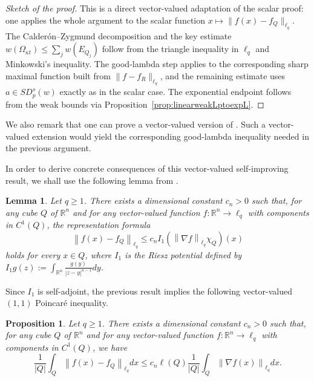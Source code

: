 \documentclass[reqno, 10pt, oneside]{amsart}
\numberwithin{equation}{section}
\newtheorem{lemma}[theorem]{Lemma}
\newtheorem{proposition}[theorem]{Proposition}
\numberwithin{theorem}{section}
\newcommand{\R}{{\mathbb R}}
\newcommand{\1}{{\rm 1\hspace*{-0.4ex}%
\rule{0.1ex}{1.52ex}\hspace*{0.2ex}}}
\begin{document}
\begin{proof}[Sketch of the proof]
This is a direct vector-valued adaptation of the scalar proof: one applies the whole argument to the scalar function $x\mapsto \|f(x)-f_Q\|_{\ell_q}$. The Calderón--Zygmund decomposition and the key estimate $w(\Omega_{\kappa t})\le \sum_j w(E_{Q_j})$ follow from the triangle inequality in $\ell_q$ and Minkowski's inequality. The good-lambda step applies to the corresponding sharp maximal function built from $\|f-f_R\|_{\ell_q}$, and the remaining estimate uses $a\in SD_p^s(w)$ exactly as in the scalar case. The exponential endpoint follows from the weak bounds via Proposition~\ref{prop:linearweakLptoexpL}.
\end{proof}

We also remark that one can prove a vector-valued version of \cite[Theorem 1.1]{CP}. Such a vector-valued extension would yield the corresponding good-lambda inequality needed in the previous argument.

In order to derive concrete consequences of this vector-valued self-improving result, we shall use the following lemma from \cite{MP}.

\begin{lemma}
	Let $q\ge 1$. There exists a dimensional constant $c_n>0$ such that, for any cube $Q$ of $\R^n$ and for any vector-valued function $f: \R^n\longrightarrow \ell_q$ with components in $C^1(Q)$, the representation formula 
	\begin{equation*}
		\left\| f(x)-f_Q \right\| _{\ell_q} \le c_n I_1(\left\| \nabla f\right\|_{\ell_q} \chi_Q) (x) 
	\end{equation*}
	holds for every $x\in Q$, where $I_1$ is the Riesz potential defined by $I_1g(z):=\int_{\mathbb{R}^n}\frac{g(y)}{|z-y|^{n-1}}dy$. 
\end{lemma}


Since $I_1$ is self-adjoint, the previous result implies the following vector-valued $(1,1)$ Poincaré inequality.

\begin{proposition}
	Let $q\ge 1$. There exists a dimensional constant $c_n>0$ such that, for any cube $Q$ of $\R^n$ and for any vector-valued function $f: \R^n\longrightarrow \ell_q$ with components in $C^1(Q)$, we have 
	\begin{equation*}
		\frac{1}{|Q|} \int_Q \left\| f(x)-f_Q \right\| _{\ell_q} dx \le c_n \ell(Q) \frac{1}{|Q|} \int_Q \left\| \nabla f(x)\right\|_{\ell_q}  dx .
	\end{equation*} 
\end{proposition}
\end{document}
